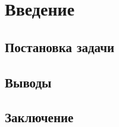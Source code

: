 \newpage
\tableofcontents

\section{Введение}


\subsection{Постановка задачи}


\subsection{Выводы}


\subsection{Заключение}
